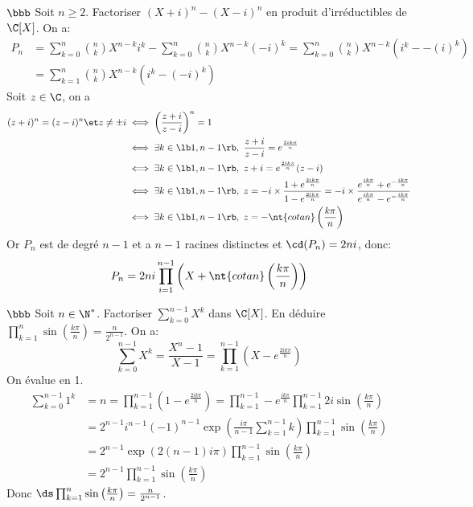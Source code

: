 \documentclass[11pt]{article}
\begin{document}
\begin{exercice}{$\bbb$}{}
    Soit $n\geq2$. Factoriser $(X+i)^n-(X-i)^n$ en produit d'irréductibles de $\C[X]$.
    \tcblower
    On a:
    \begin{align*}
        P_n &= \sum_{k=0}^n\binom{n}{k}X^{n-k}i^k - \sum_{k=0}^n\binom{n}{k}X^{n-k}(-i)^k = \sum_{k=0}^n\binom{n}{k}X^{n-k}\left( i^k - -(i)^k \right) \\
        &= \sum_{k=1}^n\binom{n}{k}X^{n-k}\left( i^k - (-i)^k \right)
    \end{align*}
    Soit $z\in\C$, on a 
    \begin{align*}
        (z+i)^n=(z-i)^n \et z\neq\pm i &\iff \left( \frac{z+i}{z-i} \right)^n = 1\\
        &\iff \exists k \in \lb1,n-1\rb, ~ \frac{z+i}{z-i} = e^{\frac{2ik\pi}{n}}\\
        &\iff \exists k \in \lb1,n-1\rb, ~ z+i = e^{\frac{2ik\pi}{n}}(z-i)\\
        &\iff \exists k \in \lb1,n-1\rb, ~ z = -i\times\frac{1+e^{\frac{2ik\pi}{n}}}{1-e^{\frac{2ik\pi}{n}}}=-i\times\frac{e^{\frac{ik\pi}{n}}+e^{-\frac{ik\pi}{n}}}{e^{\frac{ik\pi}{n}}-e^{-\frac{ik\pi}{n}}}\\
        &\iff \exists k \in \lb1,n-1\rb, ~ z = -\nt{cotan}\left( \frac{k\pi}{n} \right)
    \end{align*}
    Or $P_n$ est de degré $n-1$ et a $n-1$ racines distinctes et $\cd(P_n)=2ni$, donc:
    \begin{equation*}
        P_n = 2ni\prod_{i=1}^{n-1}\left( X + \nt{cotan}\left( \frac{k\pi}{n} \right) \right)
    \end{equation*}
\end{exercice}

\begin{exercice}{$\bbb$}{}
    Soit $n\in\N^*$. Factoriser $\sum\limits_{k=0}^{n-1}X^k$ dans $\C[X]$. En déduire $\prod\limits_{k=1}^n\sin\left( \frac{k\pi}{n} \right)=\frac{n}{2^{n-1}}$.
    \tcblower
    On a:
    \begin{equation*}
        \sum_{k=0}^{n-1}X^k=\frac{X^{n}-1}{X-1}=\prod_{k=1}^{n-1}\left( X-e^{\frac{2ik\pi}{n}} \right)
    \end{equation*}
    On évalue en 1.
    \begin{align*}
        \sum_{k=0}^{n-1}1^k&=n=\prod_{k=1}^{n-1}\left( 1-e^{\frac{2ik\pi}{n}} \right)=\prod_{k=1}^{n-1}-e^{\frac{ik\pi}{n}}\prod_{k=1}^{n-1}2i\sin\left( \frac{k\pi}{n} \right)\\
        &=2^{n-1}i^{n-1}(-1)^{n-1}\exp\left( \frac{i\pi}{n-1}\sum_{k=1}^{n-1} k \right)\prod_{k=1}^{n-1}\sin\left( \frac{k\pi}{n} \right)\\
        &=2^{n-1}\exp\left( 2(n-1)i\pi \right)\prod_{k=1}^{n-1}\sin\left( \frac{k\pi}{n} \right)\\
        &=2^{n-1}\prod_{k=1}^{n-1}\sin\left( \frac{k\pi}{n} \right)
    \end{align*}
    Donc $\ds\prod_{k=1}^{n}\sin\left( \frac{k\pi}{n} \right)=\frac{n}{2^{n-1}}$.
\end{exercice}
\end{document}

